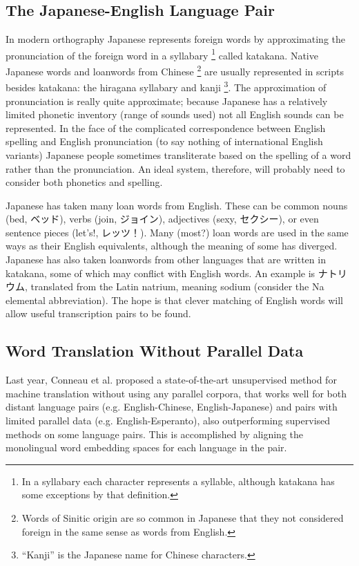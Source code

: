 \documentclass{article}
\begin{document}
\subsection*{The Japanese-English Language Pair}

In modern orthography
Japanese represents foreign words
by approximating the pronunciation of the foreign word
in a syllabary \footnote{In a syllabary each character represents a syllable,
although katakana has some exceptions by that definition.} called katakana.
Native Japanese words and loanwords from Chinese
\footnote{Words of Sinitic origin are so common in Japanese that they not considered
  foreign in the same sense as words from English.}
are usually represented in scripts besides katakana:
the hiragana syllabary and kanji
\footnote{``Kanji'' is the Japanese name for Chinese characters.}.
The approximation of pronunciation is really quite approximate;
because Japanese has a relatively limited phonetic inventory (range of sounds used)
not all English sounds can be represented.
In the face of the complicated correspondence
between English spelling and English pronunciation
(to say nothing of international English variants)
Japanese people sometimes transliterate based on the spelling of a word
rather than the pronunciation.
An ideal system,
therefore,
will probably need to consider both phonetics and spelling.

Japanese has taken many loan words from English.
These can be common nouns (bed, ベッド),
verbs (join, ジョイン),
adjectives (sexy, セクシー),
or even sentence pieces (let's!, レッツ！).
Many (most?) loan words
are used in the same ways as their English equivalents,
although the meaning of some has diverged.
Japanese has also taken loanwords from other languages
that are written in katakana,
some of which may conflict with English words.
An example is ナトリウム,
translated from the Latin natrium,
meaning sodium (consider the Na elemental abbreviation).
The hope is that clever matching of English words
will allow useful transcription pairs to be found.

\subsection*{Word Translation Without Parallel Data}

Last year, Conneau et al. proposed a state-of-the-art unsupervised method for machine
translation without using any parallel corpora, that works well for both distant
language pairs (e.g. English-Chinese, English-Japanese) and pairs with limited parallel
data (e.g. English-Esperanto), also outperforming supervised methods on some language
pairs. This is accomplished by aligning the monolingual word embedding spaces for each
language in the pair.
\end{document}
